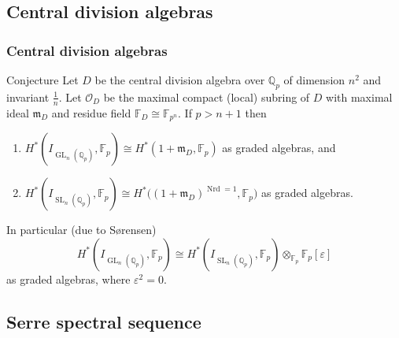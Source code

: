 \documentclass{beamer}
\newcommand*\Z{\mathbb{Z}}
\newcommand*\Q{\mathbb{Q}}
\newcommand*\F{\mathbb{F}}
\newcommand*\setSymbol[1][]{
  \nonscript\:#1\vert\allowbreak\nonscript\:\mathopen{}
}
\providecommand\given{}
\renewcommand*\given{\setSymbol[\delimsize]}
\DeclareMathOperator{\GL}{GL} %
\DeclareMathOperator{\SL}{SL} %
\DeclareMathOperator{\reduc}{red}
\DeclareMathOperator{\Nrd}{Nrd}
\newcommand*{\lie}[1]{\mathfrak{#1}} %
\newcommand*\iso{\cong} %
\newcommand*\sO{\mathcal{O}}
\newcommand*\idm{\mathfrak{m}}
\newcommand*\gs[1]{\mathcal{#1}}
\begin{document}
\subsection{Central division algebras}

\begin{frame}
  \frametitle{Central division algebras}

  \begin{block}{Conjecture}
    Let $D$ be the central division algebra over $\Q_{p}$ of dimension $n^{2}$ and invariant $\frac{1}{n}$. Let $\sO_{D}$ be the maximal compact (local) subring of $D$ with maximal ideal $\idm_{D}$ and residue field $\F_{D} \iso \F_{p^{n}}$. If $p > n+1$ then
    \begin{enumerate}[$\bullet$]
      \item $H^{*}(I_{\GL_{n}(\Q_{p})},\F_{p}) \iso H^{*}(1+\idm_{D},\F_{p})$ as graded algebras, and
      \item $H^{*}(I_{\SL_{n}(\Q_{p})},\F_{p}) \iso H^{*}\bigl( (1+\idm_{D})^{\Nrd = 1},\F_{p} \bigr)$ as graded algebras.
    \end{enumerate}
    In particular (due to Sørensen)
    \[
      H^{*}(I_{\GL_{n}(\Q_{p})},\F_{p}) \iso H^{*}(I_{\SL_{n}(\Q_{p})},\F_{p}) \otimes_{\F_{p}} \F_{p}[\varepsilon]
    \]
    as graded algebras, where $\varepsilon^{2} = 0$.
  \end{block}
\end{frame}



\subsection{Serre spectral sequence}
\end{document}
